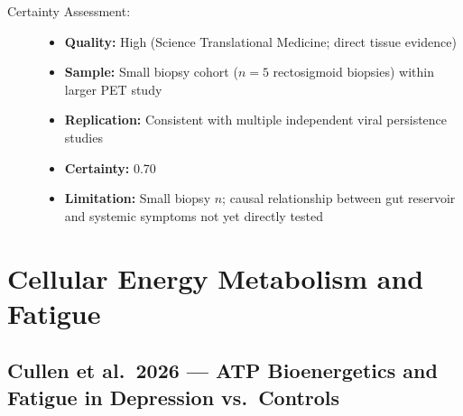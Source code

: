 \begin{description}
    \item[Certainty Assessment:]
    \begin{itemize}
        \item \textbf{Quality:} High (Science Translational Medicine; direct tissue evidence)
        \item \textbf{Sample:} Small biopsy cohort ($n=5$ rectosigmoid biopsies) within larger PET study
        \item \textbf{Replication:} Consistent with multiple independent viral persistence studies
        \item \textbf{Certainty:} 0.70
        \item \textbf{Limitation:} Small biopsy $n$; causal relationship between gut reservoir and systemic symptoms not yet directly tested
    \end{itemize}
\end{description}

\section{Cellular Energy Metabolism and Fatigue}
\label{sec:bib-energy-fatigue-2026}

\subsection{Cullen et al.\ 2026 --- ATP Bioenergetics and Fatigue in Depression vs.\ Controls}

